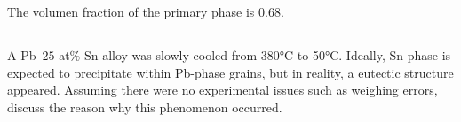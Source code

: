 \begin{mdframed}
The volumen fraction of the primary phase is 0.68.
\end{mdframed}

\newpage
\subsection{}
A Pb–$25$ at$\%$ Sn alloy was slowly cooled from 380°C to 50°C. Ideally, Sn phase is expected to precipitate within Pb-phase grains, but in reality, a eutectic structure appeared. Assuming there were no experimental issues such as weighing errors, discuss the reason why this phenomenon occurred.

